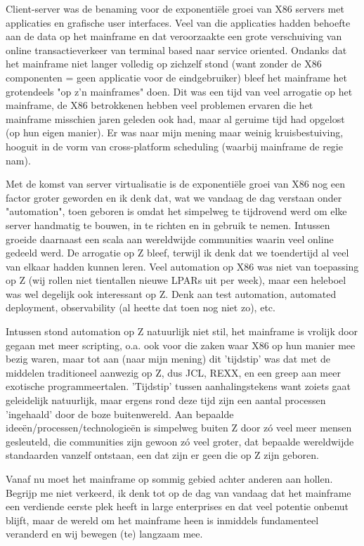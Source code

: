 Client-server was de benaming voor de exponentiële groei van X86 servers met applicaties en grafische user interfaces. Veel van die applicaties hadden behoefte aan de data op het mainframe en dat veroorzaakte een grote verschuiving van online transactieverkeer van terminal based naar service oriented. Ondanks dat het mainframe niet langer volledig op zichzelf stond (want zonder de X86 componenten = geen applicatie voor de eindgebruiker) bleef het mainframe het grotendeels "op z'n mainframes" doen. Dit was een tijd van veel arrogatie op het mainframe, de X86 betrokkenen hebben veel problemen ervaren die het mainframe misschien jaren geleden ook had, maar al geruime tijd had opgelost (op hun eigen manier). Er was naar mijn mening maar weinig kruisbestuiving, hooguit in de vorm van cross-platform scheduling (waarbij mainframe de regie nam).

Met de komst van server virtualisatie is de exponentiële groei van X86 nog een factor groter geworden en ik denk dat, wat we vandaag de dag verstaan onder "automation", toen geboren is omdat het simpelweg te tijdrovend werd om elke server handmatig te bouwen, in te richten en in gebruik te nemen. Intussen groeide daarnaast een scala aan wereldwijde communities waarin veel online gedeeld werd. De arrogatie op Z bleef, terwijl ik denk dat we toendertijd al veel van elkaar hadden kunnen leren. Veel automation op X86 was niet van toepassing op Z (wij rollen niet tientallen nieuwe LPARs uit per week), maar een heleboel was wel degelijk ook interessant op Z. Denk aan test automation, automated deployment, observability (al heette dat toen nog niet zo), etc.

Intussen stond automation op Z natuurlijk niet stil, het mainframe is vrolijk door gegaan met meer scripting, o.a. ook voor die zaken waar X86 op hun manier mee bezig waren, maar tot aan (naar mijn mening) dit 'tijdstip' was dat met de middelen traditioneel aanwezig op Z, dus JCL, REXX, en een greep aan meer exotische programmeertalen.
'Tijdstip' tussen aanhalingstekens want zoiets gaat geleidelijk natuurlijk, maar ergens rond deze tijd zijn een aantal processen 'ingehaald' door de boze buitenwereld. Aan bepaalde ideeën/processen/technologieën is simpelweg buiten Z door zó veel meer mensen gesleuteld, die communities zijn gewoon zó veel groter, dat bepaalde wereldwijde standaarden vanzelf ontstaan, een dat zijn er geen die op Z zijn geboren.

Vanaf nu moet het mainframe op sommig gebied achter anderen aan hollen. Begrijp me niet verkeerd, ik denk tot op de dag van vandaag dat het mainframe een verdiende eerste plek heeft in large enterprises en dat veel potentie onbenut blijft, maar de wereld om het mainframe heen is inmiddels fundamenteel veranderd en wij bewegen (te) langzaam mee.

